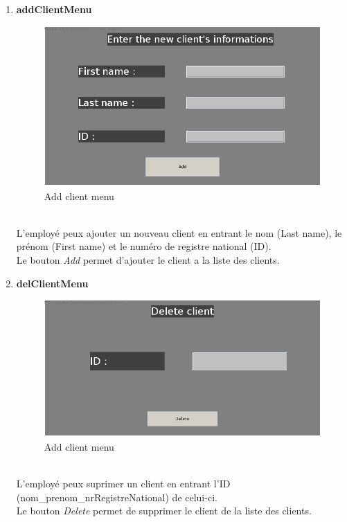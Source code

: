 \documentclass[../rapport.tex]{subfiles}
\begin{document}
\begin{enumerate}
\item \textbf{addClientMenu} \\
		\begin{figure}[h!]
				\centering \includegraphics[scale=0.2]{ressources/photos_diagrammes/app2/gui/addClientMenu.jpg}
				\caption{Add client menu}
		\end{figure}
		\\
L'employé peux ajouter un nouveau client en entrant le nom (Last name), le prénom (First name) et le numéro de registre national (ID).\\
Le bouton \textit{Add} permet d'ajouter le client a la liste des clients.\\

\item \textbf{delClientMenu} \\
		\begin{figure}[h!]
				\centering \includegraphics[scale=0.2]{ressources/photos_diagrammes/app2/gui/deleteClientMenu.jpg}
				\caption{Add client menu}
		\end{figure}
		\\
L'employé peux suprimer un client en entrant l'ID (nom\_prenom\_nrRegistreNational) de celui-ci.\\
Le bouton \textit{Delete} permet de supprimer le client de la liste des clients.\\


\end{enumerate}
\end{document}
